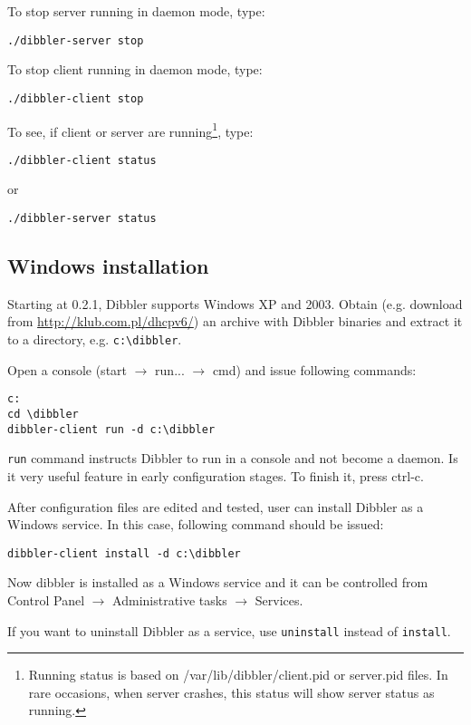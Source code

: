 To stop server running in daemon mode, type:
\begin{verbatim}
./dibbler-server stop
\end{verbatim}

To stop client running in daemon mode, type:
\begin{verbatim}
./dibbler-client stop
\end{verbatim}

To see, if client or server are running\footnote{Running status is
  based on /var/lib/dibbler/client.pid or server.pid files. In rare
  occasions, when server crashes, this status will show server status as running.}, type:
\begin{verbatim}
./dibbler-client status
\end{verbatim}

or
\begin{verbatim}
./dibbler-server status
\end{verbatim}

\subsection{Windows installation}
Starting at 0.2.1, Dibbler supports Windows XP and 2003. 
Obtain (e.g. download from \url{http://klub.com.pl/dhcpv6/}) an archive with
Dibbler binaries and extract it to a directory, e.g. \verb+c:\dibbler+.

Open a console (start $\rightarrow$ run... $\rightarrow$ cmd) and
issue following commands:

\begin{verbatim}
c:
cd \dibbler
dibbler-client run -d c:\dibbler
\end{verbatim}

\verb+run+ command instructs Dibbler to run in a console and not become a
daemon. Is it very useful feature in early configuration stages. To
finish it, press ctrl-c. 

After configuration files are edited and tested, user can install Dibbler as a
Windows service. In this case, following command should be issued:
\begin{verbatim}
dibbler-client install -d c:\dibbler
\end{verbatim}

Now dibbler is installed as a Windows service and it can be controlled
from Control Panel $\rightarrow$ Administrative tasks $\rightarrow$
Services. 

If you want to uninstall Dibbler as a service, use \verb+uninstall+
instead of \verb+install+.

